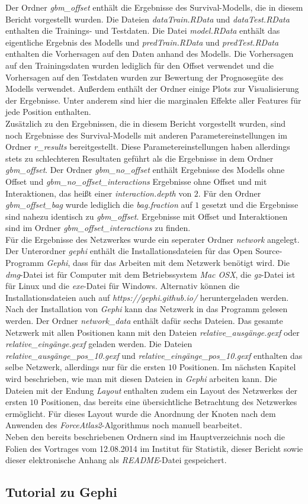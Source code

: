 Der Ordner \textit{gbm\_offset} enthält die Ergebnisse des Survival-Modells, die in diesem Bericht vorgestellt wurden. Die Dateien \textit{dataTrain.RData} und \textit{dataTest.RData} enthalten die Trainings- und Testdaten. Die Datei \textit{model.RData} enthält das eigentliche Ergebnis des Modells und \textit{predTrain.RData} und \textit{predTest.RData} enthalten die Vorhersagen auf den Daten anhand des Modells. Die Vorhersagen auf den Trainingsdaten wurden lediglich für den Offset verwendet und die Vorhersagen auf den Testdaten wurden zur Bewertung der Prognosegüte des Modells verwendet. Außerdem enthält der Ordner einige Plots zur Visualisierung der Ergebnisse. Unter anderem sind hier die marginalen Effekte aller Features für jede Position enthalten.\\
Zusätzlich zu den Ergebnissen, die in diesem Bericht vorgestellt wurden, sind noch Ergebnisse des Survival-Modells mit anderen Parametereinstellungen im Ordner \textit{r\_results} bereitgestellt. Diese Parametereinstellungen haben allerdings stets zu schlechteren Resultaten geführt als die Ergebnisse in dem Ordner \textit{gbm\_offset}. Der Ordner \textit{gbm\_no\_offset} enthält Ergebnisse des Modells ohne Offset und \textit{gbm\_no\_offset\_interactions} Ergebnisse ohne Offset und mit Interaktionen, das heißt einer \textit{interaction.depth} von $2$. Für den Ordner \textit{gbm\_offset\_bag} wurde lediglich die \textit{bag.fraction} auf $1$ gesetzt und die Ergebnisse sind nahezu identisch zu \textit{gbm\_offset}. Ergebnisse mit Offset und Interaktionen sind im Ordner \textit{gbm\_offset\_interactions} zu finden.\\
Für die Ergebnisse des Netzwerkes wurde ein seperater Ordner \textit{network} angelegt. Der Unterordner \textit{gephi} enthält die Installationsdateien für das Open Source-Programm \textit{Gephi}, dass für das Arbeiten mit dem Netzwerk benötigt wird. Die \textit{dmg}-Datei ist für Computer mit dem Betriebssystem \textit{Mac OSX}, die \textit{gz}-Datei ist für Linux und die \textit{exe}-Datei für Windows. Alternativ können die Installationsdateien auch auf \textit{https://gephi.github.io/} heruntergeladen werden.\\
Nach der Installation von \textit{Gephi} kann das Netzwerk in das Programm gelesen werden. Der Ordner \textit{network\_data} enthält dafür sechs Dateien. Das gesamte Netzwerk mit allen Positionen kann mit den Dateien \textit{relative\_ausgänge.gexf} oder \textit{relative\_eingänge.gexf} geladen werden. Die Dateien \textit{relative\_ausgänge\_pos\_10.gexf} und \textit{relative\_eingänge\_pos\_10.gexf} enthalten das selbe Netzwerk, allerdings nur für die ersten $10$ Positionen. Im nächsten Kapitel wird beschrieben, wie man mit diesen Dateien in \textit{Gephi} arbeiten kann. Die Dateien mit der Endung \textit{Layout} enthalten zudem ein Layout des Netzwerkes der ersten $10$ Positionen, das bereits eine übersichtliche Betrachtung des Netzwerkes ermöglicht. Für dieses Layout wurde die Anordnung der Knoten nach dem Anwenden des \textit{ForceAtlas2}-Algorithmus noch manuell bearbeitet.\\
Neben den bereits beschriebenen Ordnern sind im Hauptverzeichnis noch die Folien des Vortrages vom 12.08.2014 im Institut für Statistik, dieser Bericht sowie dieser elektronische Anhang als \textit{README}-Datei gespeichert.

\subsection{Tutorial zu Gephi}